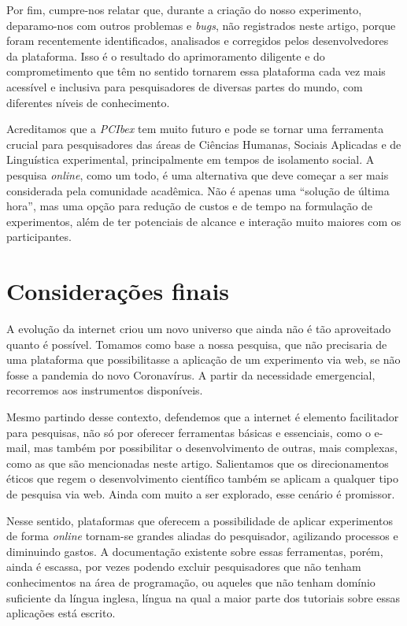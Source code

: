 \documentclass{textolivre}
\begin{document}
Por fim, cumpre-nos relatar que, durante a criação do nosso experimento, deparamo-nos com outros problemas e \emph{bugs}, não registrados neste artigo, porque foram recentemente identificados, analisados e corregidos pelos desenvolvedores da plataforma. Isso é o resultado do aprimoramento diligente e do comprometimento que \textcite{zehr2018} têm no sentido tornarem essa plataforma cada vez mais acessível e inclusiva para pesquisadores de diversas partes do mundo, com diferentes níveis de conhecimento.

Acreditamos que a \emph{PCIbex} tem muito futuro e pode se tornar uma ferramenta crucial para pesquisadores das áreas de Ciências Humanas, Sociais Aplicadas e de Linguística experimental, principalmente em tempos de isolamento social. A pesquisa \textit{online}, como um todo, é uma alternativa que deve começar a ser mais considerada pela comunidade acadêmica. Não é apenas uma “solução de última hora”, mas uma opção para redução de custos e de tempo na formulação de experimentos, além de ter potenciais de alcance e interação muito maiores com os participantes.

\section{Considerações finais}
A evolução da internet criou um novo universo que ainda não é tão aproveitado quanto é possível. Tomamos como base a nossa pesquisa, que não precisaria de uma plataforma que possibilitasse a aplicação de um experimento via web, se não fosse a pandemia do novo Coronavírus. A partir da necessidade emergencial, recorremos aos instrumentos disponíveis.

Mesmo partindo desse contexto, defendemos que a internet é elemento facilitador para pesquisas, não só por oferecer ferramentas básicas e essenciais, como o e-mail, mas também por possibilitar o desenvolvimento de outras, mais complexas, como as que são mencionadas neste artigo. Salientamos que os direcionamentos éticos que regem o desenvolvimento científico também se aplicam a qualquer tipo de pesquisa via web. Ainda com muito a ser explorado, esse cenário é promissor.

Nesse sentido, plataformas que oferecem a possibilidade de aplicar experimentos de forma \textit{online} tornam-se grandes aliadas do pesquisador, agilizando processos e diminuindo gastos. A documentação existente sobre essas ferramentas, porém, ainda é escassa, por vezes podendo excluir pesquisadores que não tenham conhecimentos na área de programação, ou aqueles que não tenham domínio suficiente da língua inglesa, língua na qual a maior parte dos tutoriais sobre essas aplicações está escrito.
\end{document}
